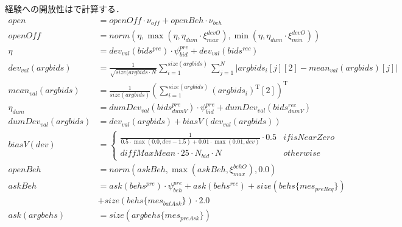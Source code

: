 経験への開放性はで計算する．
\begin{align}
    open &= \mathit{openOff} \cdot \nu_{\mathit{off}} + openBeh \cdot \nu_{beh} \label{eq:openness} \\
    \mathit{openOff} &= norm \left(\eta, \max \left(\eta, \eta_{dum} \cdot \xi_{max}^{devO}\right), \min \left(\eta, \eta_{dum} \cdot \xi_{min}^{devO}\right) \right) \nonumber \\
    \eta &= dev_{val}(bids^{pre}) \cdot \psi_{\mathit{bid}}^{pre} + dev_{val}(bids^{rec}) \nonumber \\
    dev_{val}(argbids) &= \frac{1}{\sqrt{size(argbids \cdot N}}\sum_{i = 1}^{size(argbids)} \sum_{j = 1}^{N} \left| argbids_i[j][2] - mean_{val}(argbids)[j] \right| \nonumber \\
    mean_{val}(argbids) &= \frac{1}{size(argbids)}\left(\sum_{i = 1}^{size(argbids)} (argbids_i)^{\mathrm{T}}[2] \right)^{\mathrm{T}} \nonumber \\
    \eta_{dum} &= dumDev_{val}(bids_{dumV}^{pre}) \cdot \psi_{\mathit{bid}}^{pre} + dumDev_{val}(bids_{dumV}^{rec}) \nonumber \\
    dumDev_{val}(argbids) &= dev_{val}(argbids) + biasV(dev_{val}(argbids)) \nonumber \\
    biasV(dev) &= 
    \begin{cases*}
        \frac{1}{0.5 \cdot \max (0.0, dev - 1.5) + 0.01 \cdot \max (0.01, dev)} \cdot 0.5 & if isNearZero \\
        \mathit{diffMaxMean} \cdot 25 \cdot N_{bid} \cdot N & otherwise 
    \end{cases*} \nonumber \\
    openBeh &= norm\left( askBeh, \max \left( askBeh, \xi_{max}^{\mathit{behO}}\right), 0.0 \right) \nonumber \\
    askBeh &=  ask(behs^{pre}) \cdot \psi_{beh}^{pre} + ask(behs^{rec}) + size(behs\{mes_{\mathit{preReq}}\}) \nonumber \\
    &+ size(behs\{mes_{\mathit{batAsk}}\}) \cdot 2.0 \nonumber \\
    ask(argbehs) &= size(argbehs\{mes_{\mathit{preAsk}}\}) \nonumber
\end{align}

